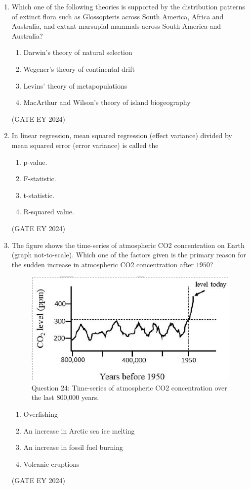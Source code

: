 \documentclass[journal]{IEEEtran}
\begin{document}
\begin{enumerate}
\item Which one of the following theories is supported by the distribution patterns of extinct flora such as Glossopteris across South America, Africa and Australia, and extant marsupial mammals across South America and Australia?
    \begin{enumerate}
        \item Darwin's theory of natural selection
        \item Wegener's theory of continental drift
        \item Levins' theory of metapopulations
        \item MacArthur and Wilson's theory of island biogeography
    \end{enumerate}
\hfill{(GATE EY 2024)}

\item In linear regression, mean squared regression (effect variance) divided by mean squared error (error variance) is called the
    \begin{multicols}{2}
    \begin{enumerate}
        \item p-value.
        \item F-statistic.
        \item t-statistic.
        \item R-squared value.
    \end{enumerate}
    \end{multicols}
\hfill{(GATE EY 2024)}

\item The figure shows the time-series of atmospheric CO2 concentration on Earth (graph not-to-scale). Which one of the factors given is the primary reason for the sudden increase in atmospheric CO2 concentration after $1950$?
\begin{figure}[!ht]
    \centering
    \includegraphics[width=0.3\columnwidth]{figs/Q-24.png}
    \caption{Question 24: Time-series of atmospheric CO2 concentration over the last 800,000 years.}
    \label{Q.24}
\end{figure}
    \begin{enumerate}
        \item Overfishing
        \item An increase in Arctic sea ice melting
        \item An increase in fossil fuel burning
        \item Volcanic eruptions
    \end{enumerate}
\hfill{(GATE EY 2024)}


\end{enumerate}
\end{document}
